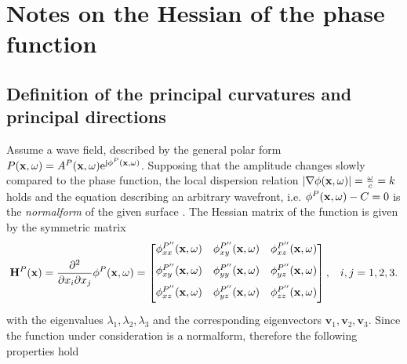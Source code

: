 \section{Notes on the Hessian of the phase function}
\label{App:Hessian}

\subsection{Definition of the principal curvatures and principal directions}
Assume a wave field, described by the general polar form $P(\mathbf{x},\omega) = A^P(\mathbf{x},\omega)\mathrm{e}^{\mathrm{j} \phi^P (\mathbf{x},\omega)}$.
Supposing that the amplitude changes slowly compared to the phase function, the local dispersion relation $| \nabla \phi(\mathbf{x},\omega) |= \frac{\omega}{c} = k$ holds and the equation describing an arbitrary wavefront, i.e. $\phi^P(\mathbf{x},\omega) - C = 0$ is the \emph{normalform} of the given surface \cite{Hartmann1999, Hartmann2001}.
The Hessian matrix of the function is given by the symmetric matrix
\begin{equation}
\mathbf{H}^P(\mathbf{x}) =
\frac{\partial^2}{\partial x_i \partial x_j} \phi^P(\mathbf{x},\omega) 
=
 \begin{bmatrix} 
\phi^{P''}_{xx}(\mathbf{x},\omega) & \phi^{P''}_{xy}(\mathbf{x},\omega) & \phi^{P''}_{xz}(\mathbf{x},\omega) \\[.7em]
\phi^{P''}_{xy}(\mathbf{x},\omega) & \phi^{P''}_{yy}(\mathbf{x},\omega) & \phi^{P''}_{yz}(\mathbf{x},\omega) \\[.7em]
\phi^{P''}_{xz}(\mathbf{x},\omega) & \phi^{P''}_{yz}(\mathbf{x},\omega) & \phi^{P''}_{zz}(\mathbf{x},\omega) \\[0.5em]    \end{bmatrix}, \hspace{3mm} i,j = 1,2,3.
\end{equation}
with the eigenvalues $\lambda_1, \lambda_2, \lambda_3$ and the corresponding eigenvectors $\mathbf{v}_1, \mathbf{v}_2, \mathbf{v}_3$.
Since the function under consideration is a normalform, therefore the following properties hold
